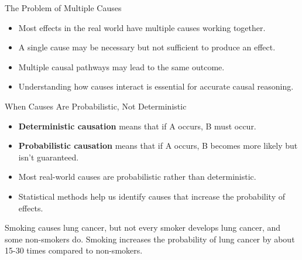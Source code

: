 \documentclass{beamer}
\begin{document}
\begin{frame}{The Problem of Multiple Causes}
    \begin{itemize}
        \item Most effects in the real world have multiple causes working together.
        \item A single cause may be necessary but not sufficient to produce an effect.
        \item Multiple causal pathways may lead to the same outcome.
        \item Understanding how causes interact is essential for accurate causal reasoning.
    \end{itemize}
    
    \begin{center}
    \end{center}
\end{frame}

\begin{frame}{When Causes Are Probabilistic, Not Deterministic}
    \begin{itemize}
        \item \textbf{Deterministic causation} means that if A occurs, B must occur.
        \item \textbf{Probabilistic causation} means that if A occurs, B becomes more likely but isn't guaranteed.
        \item Most real-world causes are probabilistic rather than deterministic.
        \item Statistical methods help us identify causes that increase the probability of effects.
    \end{itemize}
    
    \begin{example}
        Smoking causes lung cancer, but not every smoker develops lung cancer, and some non-smokers do. Smoking increases the probability of lung cancer by about 15-30 times compared to non-smokers.
    \end{example}
\end{frame}
\end{document}
